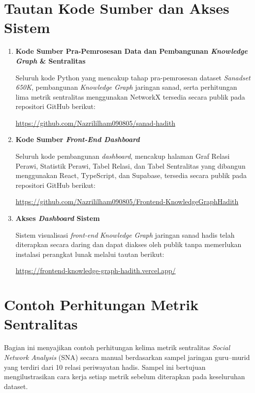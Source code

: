 \newpage
\section{Tautan Kode Sumber dan Akses Sistem}
\label{lamp:tautan}

\begin{enumerate}
    \item \textbf{Kode Sumber Pra-Pemrosesan Data dan Pembangunan \textit{Knowledge Graph} \& Sentralitas}

    Seluruh kode Python yang mencakup tahap pra-pemrosesan dataset \textit{Sanadset 650K}, pembangunan \textit{Knowledge Graph} jaringan sanad, serta perhitungan lima metrik sentralitas menggunakan NetworkX tersedia secara publik pada repositori GitHub berikut:

    \vspace{0.3cm}
    \noindent\url{https://github.com/Nazrililham090805/sanad-hadith}

    \item \textbf{Kode Sumber \textit{Front-End Dashboard}}

    Seluruh kode pembangunan \textit{dashboard}, mencakup halaman Graf Relasi Perawi, Statistik Perawi, Tabel Relasi, dan Tabel Sentralitas yang dibangun menggunakan React, TypeScript, dan Supabase, tersedia secara publik pada repositori GitHub berikut:

    \vspace{0.3cm}
    \noindent\url{https://github.com/Nazrililham090805/Frontend-KnowledgeGraphHadith}

    \item \textbf{Akses \textit{Dashboard} Sistem}

    Sistem visualisasi \textit{front-end} \textit{Knowledge Graph} jaringan sanad hadis telah diterapkan secara daring dan dapat diakses oleh publik tanpa memerlukan instalasi perangkat lunak melalui tautan berikut:

    \vspace{0.3cm}
    \noindent\url{https://frontend-knowledge-graph-hadith.vercel.app/}
\end{enumerate}

\newpage
\section{Contoh Perhitungan Metrik Sentralitas}
\label{lamp:contoh-hitung}
Bagian ini menyajikan contoh perhitungan kelima metrik sentralitas \textit{Social Network Analysis} (SNA) secara manual berdasarkan sampel jaringan guru--murid yang terdiri dari 10 relasi periwayatan hadis. Sampel ini bertujuan mengilustrasikan cara kerja setiap metrik sebelum diterapkan pada keseluruhan dataset.

